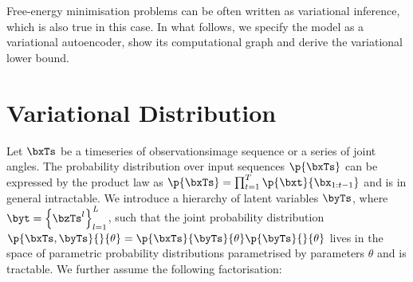 \documentclass[]{article}
\begin{document}
	Free-energy minimisation problems can be often written as variational inference, which is also true in this case. In what follows, we specify the model as a variational autoencoder, show its computational graph and derive the variational lower bound.

\section{Variational Distribution}

	Let $\bxTs$ be a timeseries of observations\eg image sequence or a series of joint angles. The probability distribution over input sequences $\p{\bxTs}$ can be expressed by the product law as $\p{\bxTs}= \prod_{t=1}^T \p{\bxt}{\bx_{1:t-1}}$ and is in general intractable. We introduce a hierarchy of latent variables $\byTs$, where $\byt = \set{ \bzTs^l }_{l=1}^L$, such that the joint probability distribution $\p{\bxTs, \byTs}{}{\theta} = \p{\bxTs}{\byTs}{\theta}\p{\byTs}{}{\theta}$ lives in the space of parametric probability distributions parametrised by parameters $\theta$ and is tractable. We further assume the following factorisation:
\end{document}
